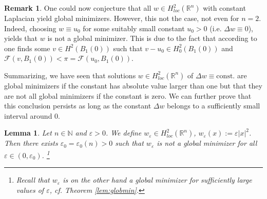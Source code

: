 \documentclass[twoside,11pt]{article}
\newtheorem{lemma}{Lemma}
\theoremstyle{definition}
\newtheorem{remark}{Remark}
\begin{document}
\begin{remark}
    One could now conjecture that all $w \in H^2_{loc}(\mathbb{R}^n)$ with constant Laplacian yield global minimizers. However,
    this not the case, not even for $n=2$. Indeed, choosing $w \equiv u_0$ for some suitably small constant $u_0 > 0$ (i.e. $\Delta w \equiv 0$), \cite[Example 4]{GMMathAnn} yields that $w$ is not a global minimizer. This is due to the fact that according to \cite[Example 4]{GMMathAnn} one finds some $v \in H^2(B_1(0))$ such that $v-u_0 \in H_0^2(B_1(0))$ and $\mathcal{F}(v,B_1(0)) < \pi = \mathcal{F}(u_0,B_1(0)).$ 
    
\end{remark}
Summarizing, we have seen that solutions $w \in H^2_{loc}(\mathbb{R}^n)$ of $\Delta w \equiv \mathrm{const.}$ are global minimizers if the constant has absolute value larger than one but that they are not all global minimizers if the constant is zero. We can further prove that this conclusion persists as long as the constant $\Delta w $ belongs to a sufficiently small interval around $0$. 
\begin{lemma} \label{lem:lemma8}
    Let $n \in \mathbb{N}$ and  $\varepsilon> 0$.
    We define  $w_{\varepsilon}\in H^2_{loc}(\mathbb{R}^n)$, $w_{\varepsilon}(x) := \varepsilon |x|^2$. Then there exists $\varepsilon_0 = \varepsilon_0(n) > 0$ such that  $w_\varepsilon$ is not a global minimizer for all $\varepsilon \in (0, \varepsilon_0)$.%
    \footnote{Recall that $w_\varepsilon$ is on the other hand  a global minimizer for sufficiently large values of $\varepsilon$, cf. Theorem \ref{lem:globmin}.} 
\end{lemma}
\end{document}
